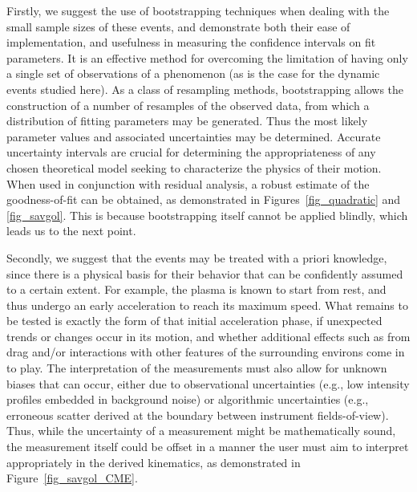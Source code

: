 \documentclass[structabstract]{aa}
\begin{document}
Firstly, we suggest the use of bootstrapping techniques when dealing with the small sample sizes of these events, and demonstrate both their ease of implementation, and usefulness in measuring the confidence intervals on fit parameters. It is an effective method for overcoming the limitation of having only a single set of observations of a phenomenon (as is the case for the dynamic events studied here). As a class of resampling methods, bootstrapping allows the construction of a number of resamples of the observed data, from which a distribution of fitting parameters may be generated. Thus the most likely parameter values and associated uncertainties may be determined. Accurate uncertainty intervals are crucial for determining the appropriateness of any chosen theoretical model seeking to characterize the physics of their motion. When used in conjunction with residual analysis, a robust estimate of the goodness-of-fit can be obtained, as demonstrated in Figures~\ref{fig_quadratic} and \ref{fig_savgol}. This is because bootstrapping itself cannot be applied blindly, which leads us to the next point.

Secondly, we suggest that the events may be treated with a priori knowledge, since there is a physical basis for their behavior that can be confidently assumed to a certain extent. For example, the plasma is known to start from rest, and thus undergo an early acceleration to reach its maximum speed. What remains to be tested is exactly the form of that initial acceleration phase, if unexpected trends or changes occur in its motion, and whether additional effects such as from drag and/or interactions with other features of the surrounding environs come in to play. The interpretation of the measurements must also allow for unknown biases that can occur, either due to observational uncertainties (e.g., low intensity profiles embedded in background noise) or algorithmic uncertainties (e.g., erroneous scatter derived at the boundary between instrument fields-of-view). Thus, while the uncertainty of a measurement might be mathematically sound, the measurement itself could be offset in a manner the user must aim to interpret appropriately in the derived kinematics, as demonstrated in Figure~\ref{fig_savgol_CME}.
\end{document}
